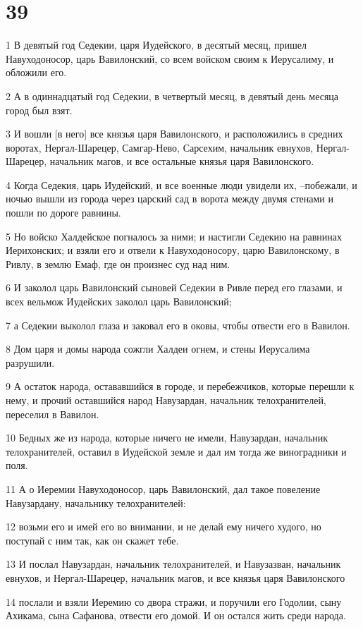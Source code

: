 \chapter{39}

\par 1 В девятый год Седекии, царя Иудейского, в десятый месяц, пришел Навуходоносор, царь Вавилонский, со всем войском своим к Иерусалиму, и обложили его.
\par 2 А в одиннадцатый год Седекии, в четвертый месяц, в девятый день месяца город был взят.
\par 3 И вошли [в него] все князья царя Вавилонского, и расположились в средних воротах, Нергал-Шарецер, Самгар-Нево, Сарсехим, начальник евнухов, Нергал-Шарецер, начальник магов, и все остальные князья царя Вавилонского.
\par 4 Когда Седекия, царь Иудейский, и все военные люди увидели их, --побежали, и ночью вышли из города через царский сад в ворота между двумя стенами и пошли по дороге равнины.
\par 5 Но войско Халдейское погналось за ними; и настигли Седекию на равнинах Иерихонских; и взяли его и отвели к Навуходоносору, царю Вавилонскому, в Ривлу, в землю Емаф, где он произнес суд над ним.
\par 6 И заколол царь Вавилонский сыновей Седекии в Ривле перед его глазами, и всех вельмож Иудейских заколол царь Вавилонский;
\par 7 а Седекии выколол глаза и заковал его в оковы, чтобы отвести его в Вавилон.
\par 8 Дом царя и домы народа сожгли Халдеи огнем, и стены Иерусалима разрушили.
\par 9 А остаток народа, остававшийся в городе, и перебежчиков, которые перешли к нему, и прочий оставшийся народ Навузардан, начальник телохранителей, переселил в Вавилон.
\par 10 Бедных же из народа, которые ничего не имели, Навузардан, начальник телохранителей, оставил в Иудейской земле и дал им тогда же виноградники и поля.
\par 11 А о Иеремии Навуходоносор, царь Вавилонский, дал такое повеление Навузардану, начальнику телохранителей:
\par 12 возьми его и имей его во внимании, и не делай ему ничего худого, но поступай с ним так, как он скажет тебе.
\par 13 И послал Навузардан, начальник телохранителей, и Навузазван, начальник евнухов, и Нергал-Шарецер, начальник магов, и все князья царя Вавилонского
\par 14 послали и взяли Иеремию со двора стражи, и поручили его Годолии, сыну Ахикама, сына Сафанова, отвести его домой. И он остался жить среди народа.
